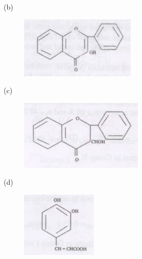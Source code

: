 \documentclass[12pt]{article}
\begin{document}
\begin{enumerate}
\begin{multicols}{2}
(b) \begin{figure}[H]
    \centering
    \includegraphics[width=0.7\columnwidth]{figs/ass1_i_q14_2.png}
    \caption{}
    \end{figure} 

(c) \begin{figure}[H]
    \centering
    \includegraphics[width=0.7\columnwidth]{figs/ass1_i_q14_3.png}
    \caption{}
    \end{figure}

(d) \begin{figure}[H]
    \centering
    \includegraphics[width=0.7\columnwidth]{figs/ass1_i_q14_4.png}
    \caption{}
    \end{figure}
    
\end{multicols}


\end{enumerate}
\end{document}
